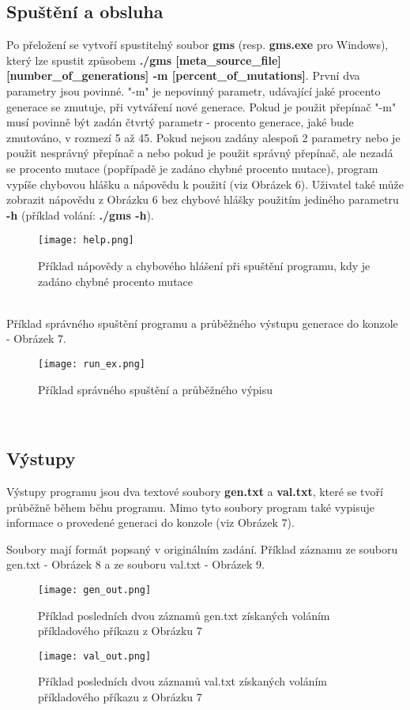 \documentclass[11pt, a4paper]{article}
\begin{document}
\subsection{Spuštění a obsluha}
Po přeložení se vytvoří spustitelný soubor \textbf{gms} (resp. \textbf{gms.exe} pro Windows), který lze spustit způsobem \textbf{./gms [meta\_source\_file] [number\_of\_generations] -m [percent\_of\_mutations]}. První dva parametry jsou povinné. "-m" je nepovinný parametr, udávající jaké procento generace se zmutuje, při vytváření nové generace. Pokud je použit přepínač "-m" musí povinně být zadán čtvrtý parametr - procento generace, jaké bude zmutováno, v rozmezí 5 až 45. Pokud nejsou zadány alespoň 2 parametry nebo je použit nesprávný přepínač a nebo pokud je použit správný přepínač, ale nezadá se procento mutace (popřípadě je zadáno chybné procento mutace), program vypíše chybovou hlášku a nápovědu k použití (viz Obrázek 6). Uživatel také může zobrazit nápovědu z Obrázku 6 bez chybové hlášky použitím jediného parametru \textbf{-h} (příklad volání: \textbf{./gms -h}).
\begin{figure}[h]
  \texttt{[image: help.png]}
  \caption{Příklad nápovědy a chybového hlášení při spuštění programu, kdy je zadáno chybné procento mutace}
  \label{fig:help}
\end{figure}\\
Příklad správného spuštění programu a průběžného výstupu generace do konzole - Obrázek 7.
\begin{figure}[h]
  \texttt{[image: run\_ex.png]}
  \caption{Příklad správného spuštění a průběžného výpisu}
  \label{fig:ex}
\end{figure}\\
\subsection{Výstupy}
Výstupy programu jsou dva textové soubory \textbf{gen.txt} a \textbf{val.txt}, které se tvoří průběžně během běhu programu. Mimo tyto soubory program také vypisuje informace o provedené generaci do konzole (viz Obrázek 7).\par
Soubory mají formát popsaný v originálním zadání. Příklad záznamu ze souboru gen.txt - Obrázek 8 a ze souboru val.txt - Obrázek 9.
\begin{figure}[h]
  \texttt{[image: gen\_out.png]}
  \caption{Příklad posledních dvou záznamů gen.txt získaných voláním příkladového příkazu z Obrázku 7}
  \label{fig:gen_out}
\end{figure}
\begin{figure}[h]
  \texttt{[image: val\_out.png]}
  \caption{Příklad posledních dvou záznamů val.txt získaných voláním příkladového příkazu z Obrázku 7}
  \label{fig:val_out}
\end{figure}
\clearpage
%
%
\end{document}
